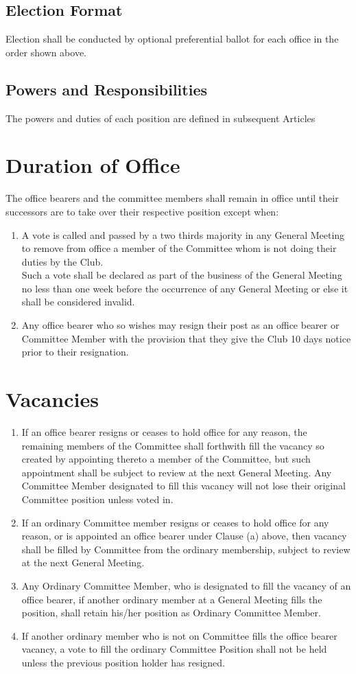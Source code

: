 \documentclass[10pt,a4paper]{report}
\begin{document}
		\subsection{Election Format} Election shall be conducted by optional preferential ballot for each office in the order shown above.

		\subsection{Powers and Responsibilities} The powers and duties of each position are defined in subsequent Articles

	\section{Duration of Office}
		The office bearers and the committee members shall remain in office until their successors are to take over their respective position except when:
			\begin{enumerate}[label=\alph*]
			\item A vote is called and passed by a two thirds majority in any General Meeting to remove from office a member of the Committee whom is not doing their duties by the Club.\\
			Such a vote shall be declared as part of the business of the General Meeting no less than one week before the occurrence of any General Meeting or else it shall be considered invalid.
			\item Any office bearer who so wishes may resign their post as an office bearer or Committee Member with the provision that they give the Club 10 days notice prior to their resignation.
		\end{enumerate}
	\section{Vacancies}
		\begin{enumerate}[label=\alph*]
			\item If an office bearer resigns or ceases to hold office for any reason, the remaining members of the Committee shall forthwith fill the vacancy so created by appointing thereto a member of the	Committee, but such appointment shall be subject to review at the next General Meeting. Any Committee Member designated to fill this vacancy will not lose their original Committee position unless voted in.
			\item If an ordinary Committee member resigns or ceases to hold office for any reason, or is appointed an office bearer under Clause (a) above, then vacancy shall be filled by Committee from the ordinary membership, subject to review at the next General Meeting.
			\item Any Ordinary Committee Member, who is designated to fill the vacancy of an office bearer, if another ordinary member at a General Meeting fills the position, shall retain his/her position as Ordinary Committee Member.
			\item If another ordinary member who is not on Committee fills the office bearer vacancy, a vote to fill the ordinary Committee Position shall not be held unless the previous position holder has resigned.
		\end{enumerate}
\end{document}

